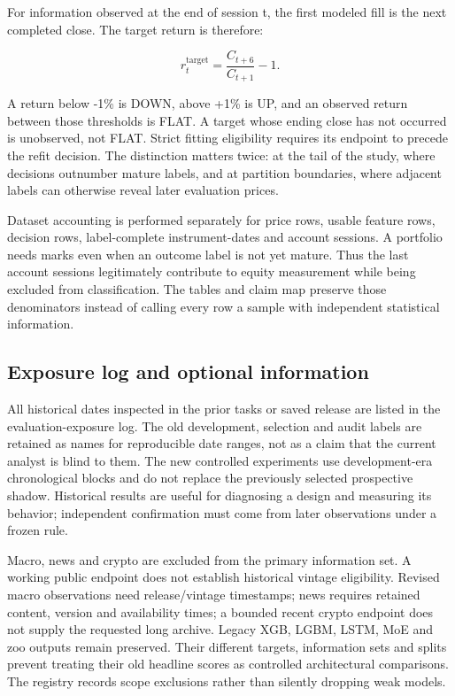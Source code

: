 \documentclass[11pt,a4paper]{article}
\begin{document}
For information observed at the end of session t, the first modeled fill is the next completed close. The target return is therefore:

\begin{equation}\label{eq:target}r^{\mathrm{target}}_t=\frac{C_{t+6}}{C_{t+1}}-1.\end{equation}

A return below -1\% is DOWN, above +1\% is UP, and an observed return between those thresholds is FLAT. A target whose ending close has not occurred is unobserved, not FLAT. Strict fitting eligibility requires its endpoint to precede the refit decision. The distinction matters twice: at the tail of the study, where decisions outnumber mature labels, and at partition boundaries, where adjacent labels can otherwise reveal later evaluation prices.

Dataset accounting is performed separately for price rows, usable feature rows, decision rows, label-complete instrument-dates and account sessions. A portfolio needs marks even when an outcome label is not yet mature. Thus the last account sessions legitimately contribute to equity measurement while being excluded from classification. The tables and claim map preserve those denominators instead of calling every row a sample with independent statistical information.

\subsection{Exposure log and optional information}

All historical dates inspected in the prior tasks or saved release are listed in the evaluation-exposure log. The old development, selection and audit labels are retained as names for reproducible date ranges, not as a claim that the current analyst is blind to them. The new controlled experiments use development-era chronological blocks and do not replace the previously selected prospective shadow. Historical results are useful for diagnosing a design and measuring its behavior; independent confirmation must come from later observations under a frozen rule.

Macro, news and crypto are excluded from the primary information set. A working public endpoint does not establish historical vintage eligibility. Revised macro observations need release/vintage timestamps; news requires retained content, version and availability times; a bounded recent crypto endpoint does not supply the requested long archive. Legacy XGB, LGBM, LSTM, MoE and zoo outputs remain preserved. Their different targets, information sets and splits prevent treating their old headline scores as controlled architectural comparisons. The registry records scope exclusions rather than silently dropping weak models.
\end{document}
